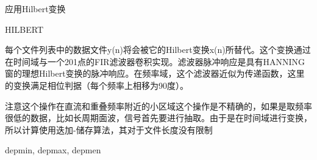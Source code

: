 \label{cmd:hilbert}

应用Hilbert变换

\begin{SACSTX}
HILBERT
\end{SACSTX}

每个文件列表中的数据文件y(n)将会被它的Hilbert变换x(n)所替代。这个变换通过在时间域与一个201点的FIR滤波器卷积实现。滤波器脉冲响应是具有HANNING窗的理想Hilbert变换的脉冲响应。在频率域，这个滤波器近似为传递函数，这里的变换满足相位判据（每个频率上相移为90度）。

注意这个操作在直流和重叠频率附近的小区域这个操作是不精确的，如果是取频率很低的数据，比如长周期面波，信号首先要进行抽取。由于是在时间域进行变换，所以计算使用迭加-储存算法，其对于文件长度没有限制

depmin, depmax, depmen
